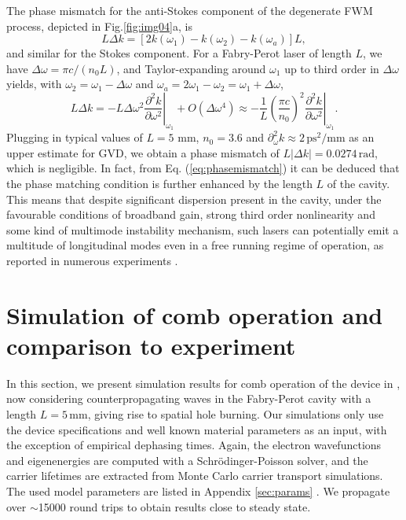 \documentclass[10pt,letterpaper]{article}%
\begin{document}
The phase mismatch for the anti-Stokes component of the degenerate FWM
process, depicted in Fig.\ref{fig:img04}a, is \cite{butcher1991elements}
\begin{equation}
L\Delta k=\left[  2k(\omega_{1})-k(\omega_{2})-k(\omega_{a})\right]  L,
\end{equation}
and similar for the Stokes component. For a Fabry-Perot laser of length $L$,
we have $\Delta\omega=\pi c/\left(  n_{0}L\right)  $, and Taylor-expanding
around $\omega_{1}$ up to third order in $\Delta\omega$ yields, with
$\omega_{2}=\omega_{1}-\Delta\omega$ and $\omega_{a}=2\omega_{1}-\omega
_{2}=\omega_{1}+\Delta\omega$,
\begin{equation}
L\Delta k=-L\Delta\omega^{2}\left.  \frac{\partial^{2}k}{\partial\omega^{2}%
}\right|  _{\omega_{1}}+O(\Delta\omega^{4})\approx-\frac{1}{L}\left(
\frac{\pi c}{n_{0}}\right)  ^{2}\left.  \frac{\partial^{2}k}{\partial
\omega^{2}}\right|  _{\omega_{1}}.\label{eq:phasemismatch}
\end{equation}
Plugging in typical values of $L=5$ mm, $n_{0}=3.6$ and $\partial_{\omega}%
^{2}k\approx2{\,}\mathrm{ps}^{2}/\mathrm{mm}$ as an upper estimate for GVD, we
obtain a phase mismatch of $L\left|  \Delta k\right|  =0.0274{\,}\mathrm{rad}%
$, which is negligible. In fact, from Eq. (\ref{eq:phasemismatch}) it can be deduced that the 
phase matching condition is further enhanced by the length $L$ of the cavity. This means that despite significant dispersion present
in the cavity, under the favourable conditions of broadband gain, strong third
order nonlinearity and some kind of multimode instability mechanism, such
lasers can potentially emit a multitude of longitudinal modes even in a free
running regime of operation, as reported in numerous experiments
\cite{wienold2014evidence,burghoff2014terahertz,hugi2012mid,rosch2015octave}.

\section{Simulation of comb operation and comparison to experiment}

\label{sec:tdsims}

In this section, we present simulation results for comb operation of the
device in \cite{burghoff2014terahertz}, now considering counterpropagating
waves in the Fabry-Perot cavity with a length $L=5{\,}\mathrm{mm}$, giving
rise to spatial hole burning. Our simulations only use the device
specifications and well known material parameters as an input, with the
exception of empirical dephasing times. Again, the electron wavefunctions and
eigenenergies are computed with a Schr{\"{o}}dinger-Poisson solver, and the
carrier lifetimes are extracted from Monte Carlo carrier transport
simulations. The used model parameters are listed in Appendix \ref{sec:params}%
. We propagate over $\sim$15000 round trips to obtain results close to steady state.
\end{document}
